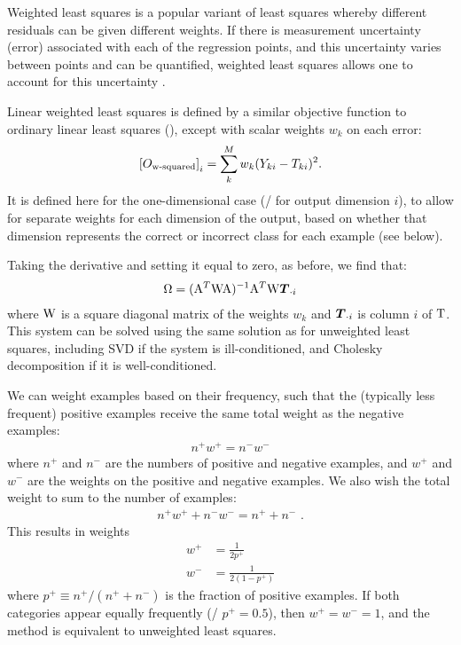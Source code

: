 Weighted least squares is a popular variant of least squares
whereby different residuals can be given different weights.
If there is measurement uncertainty (error)
associated with each of the regression points,
and this uncertainty varies between points and can be quantified,
weighted least squares allows one to account for this uncertainty \parencite{Fieguth2010}.

Linear weighted least squares is defined by a similar objective function
to ordinary linear least squares (),
except with scalar weights $w_k$ on each error:
\begin{align}
  \left[O_\text{w-squared}\right]_i = \sum^M_k w_k (Y_{ki} - T_{ki})^2.
  \eqnlabel{wsquaredloss}
\end{align}
It is defined here for the one-dimensional case (\ie/ for output dimension $i$),
to allow for separate weights for each dimension of the output,
based on whether that dimension represents the correct or incorrect class
for each example (see below).

Taking the derivative and setting it equal to zero, as before, we find that:
\begin{align}
  \Omega = (\mathrm{A}^T \mathrm{W} \mathrm{A})^{-1} \mathrm{A}^T \mathrm{W} \boldsymbol{T}_{\cdot i}
\end{align}
where $\mathrm{W}$ is a square diagonal matrix of the weights $w_k$
and $\boldsymbol{T}_{\cdot i}$ is column $i$ of $\mathrm{T}$.
This system can be solved using the same solution as for unweighted least squares,
including SVD if the system is ill-conditioned,
and Cholesky decomposition if it is well-conditioned.

We can weight examples based on their frequency,
such that the (typically less frequent) positive examples
receive the same total weight as the negative examples:
\begin{align}
  n^+ w^+ = n^- w^-
\end{align}
where $n^+$ and $n^-$ are the numbers of positive and negative examples,
and $w^+$ and $w^-$ are the weights on the positive and negative examples.
We also wish the total weight to sum to the number of examples:
\begin{align}
  n^+ w^+ + n^- w^- = n^+ + n^- \text{ .}
\end{align}
This results in weights
\begin{align}
  w^+ &= \frac{1}{2p^+} \\
  w^- &= \frac{1}{2(1 - p^+)}
\end{align}
where $p^+ \equiv n^+ / (n^+ + n^-)$ is the fraction of positive examples.
If both categories appear equally frequently (\ie/ $p^+ = 0.5$),
then $w^+ = w^- = 1$,
and the method is equivalent to unweighted least squares.

